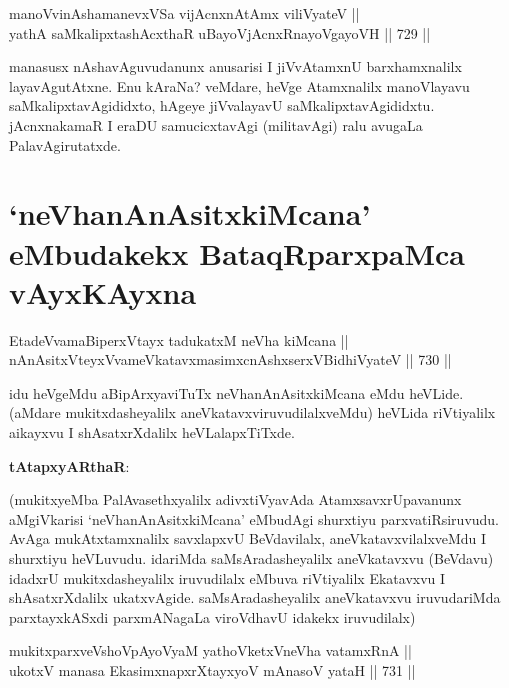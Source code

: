 \begin{shl}
manoVvinAshamanevxVSa vijAcnxnAtAmx viliVyateV || \\
yathA saMkalipxtashAcxthaR uBayoVjAcnxRnayoVgayoVH \hfill || 729 ||  
\end{shl}

\begin{artha} 
manasusx nAshavAguvudanunx anusarisi I jiVvAtamxnU barxhamxnalilx layavAgutAtxne. Enu kAraNa? veMdare, heVge Atamxnalilx manoVlayavu saMkalipxtavAgididxto, hAgeye jiVvalayavU saMkalipxtavAgididxtu. jAcnxnakamaR I eraDU samucicxtavAgi (militavAgi) ralu avugaLa PalavAgirutatxde.
\end{artha}

\section*{`neVhanAnAsitxkiMcana' eMbudakekx BataqRparxpaMca vAyxKAyxna}


\begin{shl}
EtadeVvamaBiperxVtayx tadukatxM neVha kiMcana || \\
nAnA\s sitxVteyxVvameVkatavxmasimxcnAshxserxV\s BidhiVyateV \hfill || 730 ||  
\end{shl}

\begin{artha} 
idu heVgeMdu aBipArxyaviTuTx neVhanAnAsitxkiMcana eMdu heVLide. (aMdare mukitxdasheyalilx aneVkatavxviruvudilalxveMdu) heVLida riVtiyalilx aikayxvu I shAsatxrXdalilx heVLalapxTiTxde.
\end{artha}


\textbf{tAtapxyARthaR}:

(mukitxyeMba PalAvasethxyalilx adivxtiVyavAda 
AtamxsavxrUpavanunx 
aMgiVkarisi `neVhanAnAsitxkiMcana' eMbudAgi shurxtiyu 
parxvatiRsiruvudu. AvAga mukAtxtamxnalilx savxlapxvU BeVdavilalx, 
aneVkatavxvilalxveMdu I shurxtiyu heVLuvudu. idariMda 
saMsAradasheyalilx aneVkatavxvu (BeVdavu) idadxrU mukitxdasheyalilx 
iruvudilalx eMbuva riVtiyalilx Ekatavxvu I shAsatxrXdalilx 
ukatxvAgide. saMsAradasheyalilx aneVkatavxvu iruvudariMda 
parxtayxkASxdi parxmANagaLa viroVdhavU idakekx iruvudilalx)
	

\begin{shl}
mukitxparxveVshoVpAyoV\s yaM yathoVketxVneVha vatamxRnA || \\
ukotxV manasa EkasimxnapxrXtayxyoV mAnasoV yataH \hfill || 731 ||  
\end{shl}

